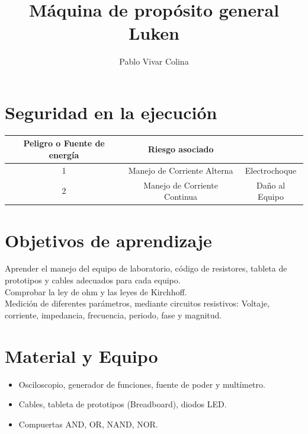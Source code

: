 \documentclass[]{article}
\title{Máquina de propósito general Luken}
\author{Pablo Vivar Colina}
\begin{document}
	

\maketitle



\section{Seguridad en la ejecución}

\begin{table}[h!]
	\begin{tabular}{|c|c|c|}
		\hline
		\textbf{Peligro o Fuente de energía} & \textbf{Riesgo asociado}     & \textbf{}      \\ \hline
		1                                    & Manejo de Corriente Alterna  & Electrochoque  \\ \hline
		2                                    & Manejo de Corriente Continua & Daño al Equipo \\ \hline
	\end{tabular}
\end{table}

\section{Objetivos de aprendizaje}

Aprender el manejo del equipo de laboratorio, código de resistores, tableta de prototipos y cables adecuados para cada equipo.\\
Comprobar la ley de ohm y las leyes de Kirchhoff.\\
Medición de diferentes parámetros, mediante circuitos resistivos: Voltaje, corriente, impedancia, frecuencia, periodo, fase y magnitud.\\

\section{Material y Equipo}

\begin{itemize}
	 
	 \item Osciloscopio, generador de funciones, fuente de poder y multímetro.
	 \item Cables, tableta de prototipos (Breadboard), diodos LED.
	 \item Compuertas AND, OR, NAND, NOR.
	 
\end{itemize}
\end{document}

